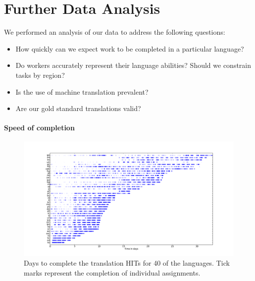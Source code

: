 \documentclass[11pt]{article}
\begin{document}
\section{Further Data Analysis}

We performed an analysis of our data to address the following questions:
\begin{itemize}
\item How quickly can we expect work to be completed in a particular language? 
\item Do workers accurately represent their language abilities?  Should we constrain tasks by region? 
\item Is the use of machine translation prevalent?  
\item Are our gold standard translations valid? 
\end{itemize}


\paragraph{Speed of completion}

\begin{figure}[h]
\includegraphics[height=\linewidth,angle=270]{final-figures/completetime}
\caption{Days to complete the translation HITs for 40 of the languages. Tick marks represent the completion of individual assignments. }
\label{completion-time}
\end{figure}
\end{document}
